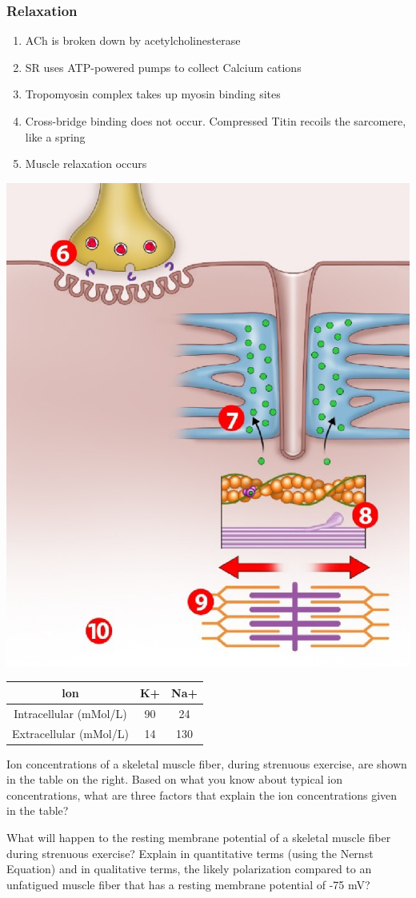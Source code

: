 \documentclass[11pt,fleqn]{book}
\begin{document}
\subsubsection{Relaxation}
\begin{enumerate}[start=6]
    \item ACh is broken down by
acetylcholinesterase
    \item SR uses ATP-powered pumps
to collect Calcium cations
    \item Tropomyosin complex takes
up myosin binding sites
    \item Cross-bridge binding does not
occur. Compressed Titin recoils
the sarcomere, like a spring
    \item Muscle relaxation occurs
\end{enumerate}

\begin{center}
    \includegraphics[width=0.31\linewidth]{Pictures/Screenshot 2024-04-03 225216.png}
\end{center}

\begin{exercise}
\begin{tabular}{ccc}
\textbf{lon}  & \textbf{K+}  & \textbf{Na+} \\
\hline
Intracellular (mMol/L) &  90  & 24 \\
Extracellular (mMol/L) &  14  & 130 
\end{tabular}

    Ion concentrations of a
skeletal muscle fiber,
during strenuous exercise,
are shown in the table on
the right. Based on what
you know about typical ion
concentrations, what are
three factors that explain
the ion concentrations
given in the table?
\end{exercise}

\begin{exercise}
    What will happen to the
resting membrane
potential of a skeletal
muscle fiber during
strenuous exercise? Explain in quantitative
terms (using the Nernst
Equation) and in qualitative
terms, the likely
polarization compared to
an unfatigued muscle fiber
that has a resting
membrane potential of -75
mV?
\end{exercise}
\end{document}
